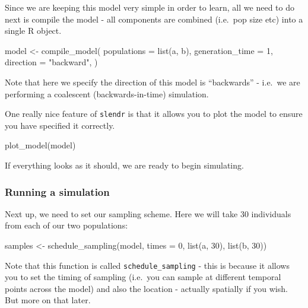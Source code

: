 \documentclass[
  letterpaper,
  DIV=11,
  numbers=noendperiod]{scrartcl}
\newenvironment{Shaded}{\begin{snugshade}}{\end{snugshade}}
\newcommand{\AttributeTok}[1]{\textcolor[rgb]{0.40,0.45,0.13}{#1}}
\newcommand{\DecValTok}[1]{\textcolor[rgb]{0.68,0.00,0.00}{#1}}
\newcommand{\FunctionTok}[1]{\textcolor[rgb]{0.28,0.35,0.67}{#1}}
\newcommand{\NormalTok}[1]{\textcolor[rgb]{0.00,0.23,0.31}{#1}}
\newcommand{\OtherTok}[1]{\textcolor[rgb]{0.00,0.23,0.31}{#1}}
\newcommand{\StringTok}[1]{\textcolor[rgb]{0.13,0.47,0.30}{#1}}
\begin{document}
Since we are keeping this model very simple in order to learn, all we
need to do next is compile the model - all components are combined
(i.e.~pop size etc) into a single R object.

\begin{Shaded}
\begin{Highlighting}[]
\NormalTok{model }\OtherTok{\textless{}{-}} \FunctionTok{compile\_model}\NormalTok{(}
  \AttributeTok{populations =} \FunctionTok{list}\NormalTok{(a, b),}
  \AttributeTok{generation\_time =} \DecValTok{1}\NormalTok{,}
  \AttributeTok{direction =} \StringTok{"backward"}\NormalTok{,}
\NormalTok{)}
\end{Highlighting}
\end{Shaded}

Note that here we specify the direction of this model is ``backwards'' -
i.e.~we are performing a coalescent (backwards-in-time) simulation.

One really nice feature of \texttt{slendr} is that it allows you to plot
the model to ensure you have specified it correctly.

\begin{Shaded}
\begin{Highlighting}[]
\FunctionTok{plot\_model}\NormalTok{(model)}
\end{Highlighting}
\end{Shaded}

If everything looks as it should, we are ready to begin simulating.

\hypertarget{running-a-simulation}{%
\subsubsection{Running a simulation}\label{running-a-simulation}}

Next up, we need to set our sampling scheme. Here we will take 30
individuals from each of our two populations:

\begin{Shaded}
\begin{Highlighting}[]
\NormalTok{samples }\OtherTok{\textless{}{-}} \FunctionTok{schedule\_sampling}\NormalTok{(model, }\AttributeTok{times =} \DecValTok{0}\NormalTok{, }\FunctionTok{list}\NormalTok{(a, }\DecValTok{30}\NormalTok{), }\FunctionTok{list}\NormalTok{(b, }\DecValTok{30}\NormalTok{))}
\end{Highlighting}
\end{Shaded}

Note that this function is called \texttt{schedule\_sampling} - this is
because it allows you to set the timing of sampling (i.e.~you can sample
at different temporal points across the model) and also the location -
actually spatially if you wish. But more on that later.
\end{document}

